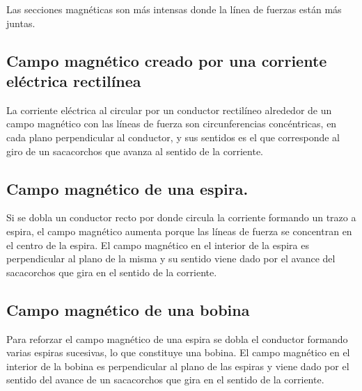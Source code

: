 \documentclass[../main]{subfiles}
\begin{document}
Las secciones magnéticas son más intensas donde la línea de fuerzas están más juntas.


\begin{center}
\end{center}

\subsection{Campo magnético creado por una corriente eléctrica rectilínea}

La corriente eléctrica al circular por un conductor rectilíneo alrededor de un campo magnético con las líneas de fuerza son circunferencias concéntricas, en cada plano perpendicular al conductor, y sus sentidos es el que corresponde al giro de un sacacorchos que avanza al sentido de la corriente.

\subsection{Campo magnético de una espira.}

Si se dobla un conductor recto por donde circula la corriente formando un trazo a espira, el campo magnético aumenta porque las líneas de fuerza se concentran en el centro de la espira. El campo magnético en el interior de la espira es perpendicular al plano de la misma y su sentido viene dado por el avance del sacacorchos que gira en el sentido de la corriente.

\subsection{Campo magnético de una bobina}


Para reforzar el campo magnético de una espira se dobla el conductor formando varias espiras sucesivas, lo que constituye una bobina. El campo magnético en el interior de la bobina es perpendicular al plano de las espiras y viene dado por el sentido del avance de un sacacorchos que gira en el sentido de la corriente.
\end{document}
